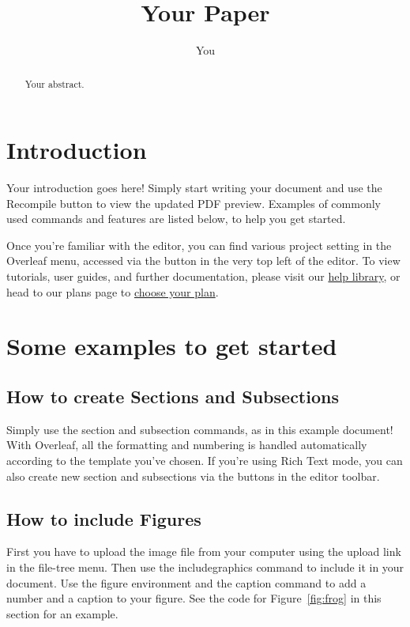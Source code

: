 \documentclass{article}
\title{Your Paper}
\author{You}
\begin{document}
\maketitle

\begin{abstract}
Your abstract.
\end{abstract}

\section{Introduction}

Your introduction goes here! Simply start writing your document and use the
Recompile button to view the updated PDF preview. Examples of commonly used
commands and features are listed below, to help you get started.

Once you're familiar with the editor, you can find various project setting in
the Overleaf menu, accessed via the button in the very top left of the editor.
To view tutorials, user guides, and further documentation, please visit our
\href{https://www.overleaf.com/learn}{help library}, or head to our plans page
to \href{https://www.overleaf.com/user/subscription/plans}{choose your plan}.



\section{Some examples to get started}

\subsection{How to create Sections and Subsections}

Simply use the section and subsection commands, as in this example document!
With Overleaf, all the formatting and numbering is handled automatically
according to the template you've chosen. If you're using Rich Text mode, you can
also create new section and subsections via the buttons in the editor toolbar.

\subsection{How to include Figures}

First you have to upload the image file from your computer using the upload link
in the file-tree menu. Then use the includegraphics command to include it in
your document. Use the figure environment and the caption command to add a
number and a caption to your figure. See the code for Figure~\ref{fig:frog} in
this section for an example.
\end{document}
